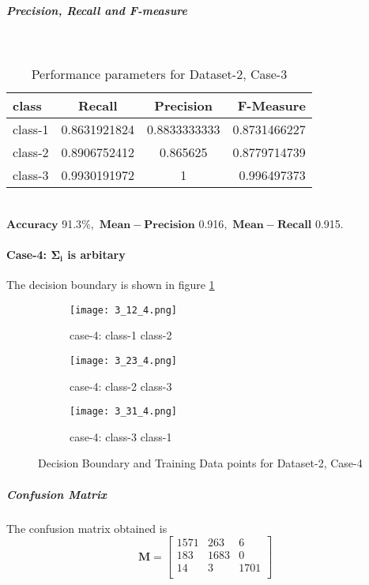 \documentclass[a4paper]{article}
\begin{document}
\subparagraph{Precision, Recall and F-measure} \textcolor{white}{:}
\begin{table}[h!]
  \begin{center}
    \caption{Performance parameters for Dataset-2, Case-3}
    \label{tab:table1}
    \begin{tabular}{l|c|c|r} %
      \textbf{class} & \textbf{Recall} & \textbf{Precision} & \textbf{F-Measure}\\
      \hline
      class-1 & 0.8631921824 & 0.8833333333 & 0.8731466227\\
      class-2 & 0.8906752412 & 0.865625 & 0.8779714739\\
      class-3 & 0.9930191972 & 1 & 0.996497373\\
    \end{tabular}
  \end{center}
\end{table}
\\$\mathbf{Accuracy}$ 91.3$\%,$ $\mathbf{Mean- Precision}$ 0.916$,$ $\mathbf{Mean- Recall}$ 0.915$.$ 
\newpage
\paragraph{Case-4: $\mathbf{\Sigma_{i}}$ is arbitary}
The decision boundary is shown in figure \ref{fig:3_4}
\begin{figure}[h!]
  \centering
  \begin{subfigure}[b]{0.4\linewidth}
    \texttt{[image: 3\_12\_4.png]}
     \caption{case-4: class-1 class-2}
  \end{subfigure}
  \begin{subfigure}[b]{0.4\linewidth}
    \texttt{[image: 3\_23\_4.png]}
    \caption{case-4: class-2 class-3}
  \end{subfigure}
  \begin{subfigure}[b]{0.4\linewidth}
    \texttt{[image: 3\_31\_4.png]}
    \caption{case-4: class-3 class-1}
  \end{subfigure}
  \caption{Decision Boundary and Training Data points for Dataset-2, Case-4}
  \label{fig:3_4}
\end{figure}
\subparagraph{Confusion Matrix}
The confusion matrix obtained is
\[
\mathbf{M} = \left[ {\begin{array}{ccc}
1571 & 263 & 6\\
183 & 1683 & 0\\
14 & 3 & 1701\\
\end{array}} \right]
\]
\\
\end{document}
